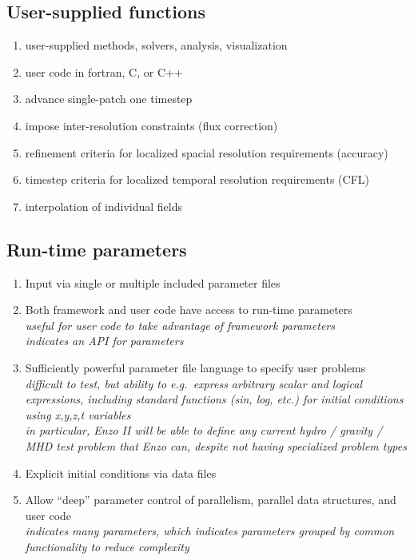 \documentclass{article}
\begin{document}
\subsection{User-supplied functions}

\begin{enumerate}
   \item user-supplied methods, solvers, analysis, visualization
   \item user code in fortran, C, or C++
   \item advance single-patch one timestep
   \item impose inter-resolution constraints (flux correction)
   \item refinement criteria for localized spacial resolution requirements (accuracy)
   \item timestep criteria for localized temporal resolution requirements (CFL)
   \item interpolation of individual fields
\end{enumerate}

\subsection{Run-time parameters}

\begin{enumerate}
    \item Input via single or multiple included parameter files
    \item Both framework and user code have access to run-time parameters
      \\ \textit{useful for user code to take advantage of framework parameters }
      \\ \textit{indicates an API for parameters }
    \item Sufficiently powerful parameter file language to specify user problems
      \\ \textit{difficult to test, but ability to e.g.~express arbitrary scalar and
        logical expressions, including standard functions (sin, log, etc.) for initial conditions using x,y,z,t variables }
      \\ \textit{in particular, Enzo II will be able to define any current
        hydro / gravity / MHD test problem that Enzo can, despite not having
        specialized problem types }
    \item Explicit initial conditions via data files
    \item Allow ``deep'' parameter control of parallelism, parallel data 
      structures, and user code
      \\ \textit{indicates many parameters, which indicates parameters grouped by common functionality to reduce complexity }
\end{enumerate}
 
\end{document}
